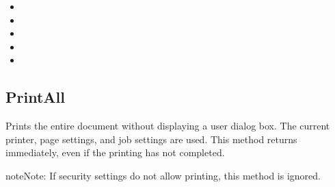 \documentclass[letterpaper,12pt,english,openany,oneside]{sphinxmanual}
\begin{document}

\begin{sphinxVerbatim}[commandchars=\\\{\}]
 
\end{sphinxVerbatim}
\label{\detokenize{IAC_API_OLE_Objects:related-methods-140}}
\begin{itemize}
\item {} 
 

\item {} 
 

\item {} 
 

\item {} 
 

\item {} 
 

\end{itemize}




\subsection{PrintAll}
\label{\detokenize{IAC_API_OLE_Objects:printall}}
Prints the entire document without displaying a user dialog box. The current printer, page settings, and job settings are used. This method returns immediately, even if the printing has not completed.

\begin{sphinxadmonition}{note}{Note:}
If security settings do not allow printing, this method is ignored.
\end{sphinxadmonition}

\end{document}
